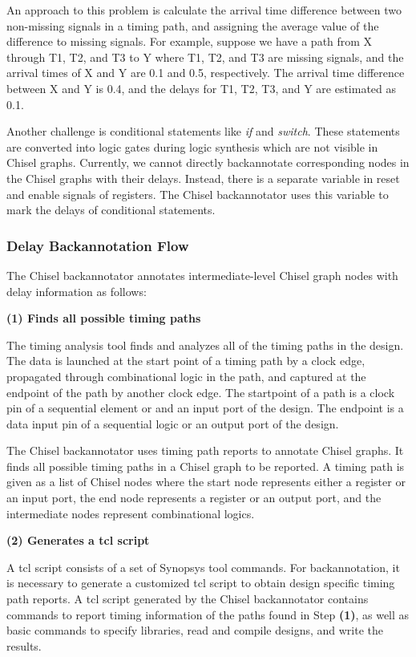 An approach to this problem is calculate the arrival time difference between two non-missing signals in a timing path, and assigning the average value of the difference to missing signals. For example, suppose we have a path from X through T1, T2, and T3 to Y where T1, T2, and T3 are missing signals, and the arrival times of X and Y are 0.1 and 0.5, respectively. The arrival time difference between X and Y is 0.4, and the delays for T1, T2, T3, and Y are estimated as 0.1.

Another challenge is conditional statements like \emph{if} and \emph{switch}. These statements are converted into logic gates during logic synthesis which are not visible in Chisel graphs. Currently, we cannot directly backannotate corresponding nodes in the Chisel graphs with their delays. Instead, there is a separate variable in reset and enable signals of registers. The Chisel backannotator uses this variable to mark the delays of conditional statements.

\subsubsection{Delay Backannotation Flow}
The Chisel backannotator annotates intermediate-level Chisel graph nodes with delay information as follows:

{\bf (1) Finds all possible timing paths}
	
The timing analysis tool finds and analyzes all of the timing paths in the design. The data is launched at the start point of a timing path by a clock edge, propagated through combinational logic in the path, and captured at the endpoint of the path by another clock edge. The startpoint of a path is a clock pin of a sequential element or and an input port of the design. The endpoint is a data input pin of a sequential logic or an output port of the design. 

The Chisel backannotator uses timing path reports to annotate Chisel graphs. It finds all possible timing paths in a Chisel graph to be reported. A timing path is given as a list of Chisel nodes where the start node represents either a register or an input port, the end node represents a register or an output port, and the intermediate nodes represent combinational logics. 

{\bf (2) Generates a tcl script}

A tcl script consists of a set of Synopsys tool commands. For backannotation, it is necessary to generate a customized tcl script to obtain design specific timing path reports. A tcl script generated by the Chisel backannotator contains commands to report timing information of the paths found in Step {\bf (1)}, as well as basic commands to specify libraries, read and compile designs, and write the results. 

